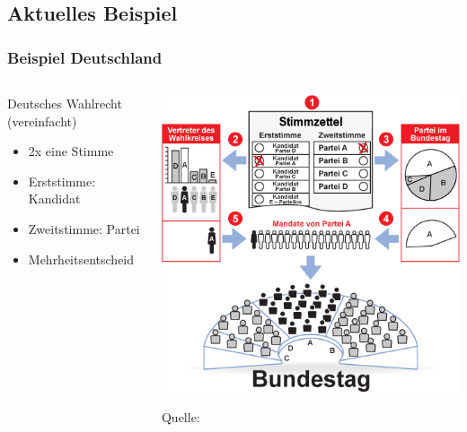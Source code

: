 \documentclass{beamer}
\begin{document}
\subsection{Aktuelles Beispiel}
\begin{frame}[fragile]
	\frametitle{Beispiel Deutschland}
	\begin{columns}
		\begin{column}[t]{0.6\textwidth}
				\begin{block}{Deutsches Wahlrecht (vereinfacht)}
				
				\begin{itemize}
					\item 2x eine Stimme
					\item Erststimme: Kandidat
					\item Zweitstimme: Partei
					\item Mehrheitsentscheid
				\end{itemize}
					
				\end{block}
			\end{column}
			\begin{column}[t]{0.4\textwidth}
				\begin{block}
				
				\includegraphics[width=\linewidth]{Pers-Ver-Wahl-v4}
				
				\footnotesize{Quelle: \cite{imgdtwahl}}
				
				
				\end{block}
			\end{column}
		\end{columns}
\end{frame}
\end{document}

